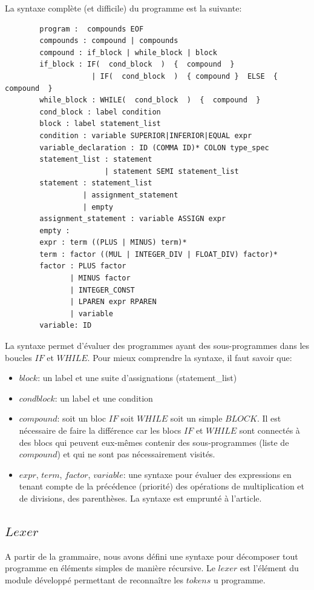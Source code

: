 \documentclass[a4paper]{article}
\begin{document}
La syntaxe complète (et difficile) du programme est la suivante: 
\begin{verbatim}
        program :  compounds EOF
        compounds : compound | compounds
        compound : if_block | while_block | block
        if_block : IF(  cond_block  )  {  compound  }
                    | IF(  cond_block  )  { compound }  ELSE  {  compound  }
        while_block : WHILE(  cond_block  )  {  compound  }
        cond_block : label condition
        block : label statement_list
        condition : variable SUPERIOR|INFERIOR|EQUAL expr
        variable_declaration : ID (COMMA ID)* COLON type_spec
        statement_list : statement
                       | statement SEMI statement_list
        statement : statement_list
                  | assignment_statement
                  | empty
        assignment_statement : variable ASSIGN expr
        empty :
        expr : term ((PLUS | MINUS) term)*
        term : factor ((MUL | INTEGER_DIV | FLOAT_DIV) factor)*
        factor : PLUS factor
               | MINUS factor
               | INTEGER_CONST
               | LPAREN expr RPAREN
               | variable
        variable: ID
\end{verbatim}
La syntaxe permet d'évaluer des programmes ayant des sous-programmes dans les boucles $IF$ et $WHILE$. 
Pour mieux comprendre la syntaxe, il faut savoir que: 
\begin{itemize}
\item $block$: un label et une suite d'assignations (statement\_list) 
\item $condblock$: un label et une condition
\item $compound$: soit un bloc $IF$ soit $WHILE$ soit un simple $BLOCK$. Il est nécessaire de faire la différence car les blocs $IF$ et $WHILE$ sont connectés à des blocs qui peuvent eux-mêmes contenir des sous-programmes (liste de $compound$) et qui ne sont pas nécessairement visités. 
\item $expr$, $term$, $factor$, $variable$:  une syntaxe pour évaluer des expressions en tenant compte de la précédence (priorité) des opérations de multiplication et de divisions, des parenthèses. La syntaxe est emprunté à l'article\cite{1}.
\end{itemize}

\subsection{$Lexer$}

A partir de la grammaire, nous avons défini une syntaxe pour décomposer tout programme en éléments simples de manière récursive. Le $lexer$ est l'élément du module développé permettant de reconnaître les $tokens$ u programme. 
\end{document}
